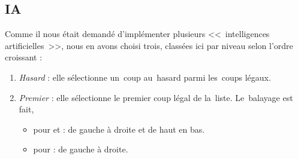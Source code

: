 \subsection{IA}
Comme il nous était demandé d'implémenter plusieurs <<~intelligences artificielles~>>, 
nous en avons choisi trois, classées ici par niveau selon l'ordre croissant :

\begin{enumerate}
	\item \emph{Hasard} : elle sélectionne un~coup au~hasard parmi les~coups légaux.
    \item \emph{Premier} : elle sélectionne le premier coup légal de la~liste. Le~balayage est fait,
    \begin{itemize}
        \item pour \oth{} et \ttt{} : de gauche à droite et de haut en bas.
        \item pour \cf{} : de gauche à droite.
    \end{itemize}
\end{enumerate}